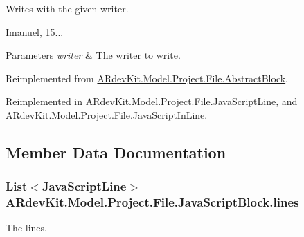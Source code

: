 Writes with the given writer. 

Imanuel, 15... 


\begin{DoxyParams}{Parameters}
{\em writer} & The writer to write. \\
\hline
\end{DoxyParams}


Reimplemented from \hyperlink{class_a_rdev_kit_1_1_model_1_1_project_1_1_file_1_1_abstract_block_a0b27a217de18a766c6647b71c41cc0ea}{A\-Rdev\-Kit.\-Model.\-Project.\-File.\-Abstract\-Block}.



Reimplemented in \hyperlink{class_a_rdev_kit_1_1_model_1_1_project_1_1_file_1_1_java_script_line_a9a1d47796fc64a50ccd602df70d1d562}{A\-Rdev\-Kit.\-Model.\-Project.\-File.\-Java\-Script\-Line}, and \hyperlink{class_a_rdev_kit_1_1_model_1_1_project_1_1_file_1_1_java_script_in_line_a49f0664d2621cc8d5e0589c202c19b10}{A\-Rdev\-Kit.\-Model.\-Project.\-File.\-Java\-Script\-In\-Line}.



\subsection{Member Data Documentation}
\hypertarget{class_a_rdev_kit_1_1_model_1_1_project_1_1_file_1_1_java_script_block_ab457f6d9da4273e687f70bbef48e80cc}{
\subsubsection[{lines}]{\setlength{\rightskip}{0pt plus 5cm}List$<${\bf Java\-Script\-Line}$>$ A\-Rdev\-Kit.\-Model.\-Project.\-File.\-Java\-Script\-Block.\-lines\hspace{0.3cm}{\ttfamily [protected]}}}\label{class_a_rdev_kit_1_1_model_1_1_project_1_1_file_1_1_java_script_block_ab457f6d9da4273e687f70bbef48e80cc}


The lines. 

